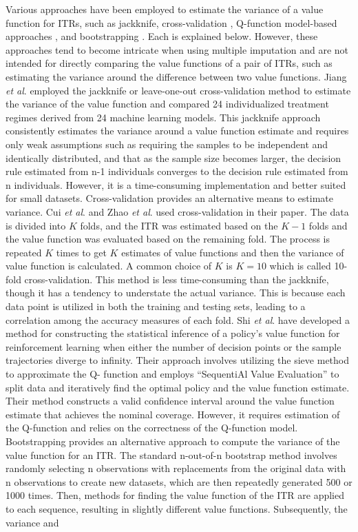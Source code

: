 \documentclass{article}
\begin{document}
Various approaches have been employed to estimate the variance of a value function for ITRs, such as jackknife\citep{jiang2021precision}, cross-validation \citep{cui2017tree, zhao2012estimating}, Q-function model-based approaches \citep{shi2022statistical}, and bootstrapping \citep{efron1992bootstrap}. Each is explained below. However, these approaches tend to become intricate when using multiple imputation and are not intended for directly comparing the value functions of a pair of ITRs, such as estimating the variance around the difference between two value functions. Jiang \textit{et al}\cite{jiang2021precision}. employed the jackknife or leave-one-out cross-validation method to estimate the variance of the value function and compared 24 individualized treatment regimes derived from 24 machine learning models. This jackknife approach consistently estimates the variance around a value function estimate and requires only weak assumptions such as requiring the samples to be independent and identically distributed, and that as the sample size becomes larger, the decision rule estimated from n-1 individuals converges to the decision rule estimated from n individuals. However, it is a time-consuming implementation and better suited for small datasets. Cross-validation provides an alternative means to estimate variance. Cui \textit{et al}.\cite{cui2017tree} and Zhao \textit{et al}. \cite{zhao2012estimating} used cross-validation in their paper. The data is divided into $K$ folds, and the ITR was estimated based on the $K-1$ folds and the value function was evaluated based on the remaining fold. The process is repeated $K$ times to get $K$ estimates of value functions and then the variance of value function is calculated. A common choice of $K$ is $K=10$ which is called 10-fold cross-validation. This method is less time-consuming than the jackknife, though it has a tendency to understate the actual variance. This is because each data point is utilized in both the training and testing sets, leading to a correlation among the accuracy measures of each fold. \citep{bates2021cross}  Shi \textit{et al}.\cite{shi2022statistical} have developed a method for constructing the statistical inference of a policy’s value function for reinforcement learning when either the number of decision points or the sample trajectories diverge to infinity. Their approach involves utilizing the sieve method to approximate the Q- function and employs “SequentiAl Value Evaluation” to split data and iteratively find the optimal policy and the value function estimate. Their method constructs a valid confidence interval around the value function estimate that achieves the nominal coverage. However, it requires estimation of the Q-function and relies on the correctness of the Q-function model. Bootstrapping provides an alternative approach to compute the variance of the value function for an ITR. The standard n-out-of-n bootstrap method \cite{efron1992bootstrap} involves randomly selecting n observations with replacements from the original data with n observations to create new datasets, which are then repeatedly generated 500 or 1000 times. Then, methods for finding the value function of the ITR are applied to each sequence, resulting in slightly different value functions. Subsequently, the variance and 
\end{document}
